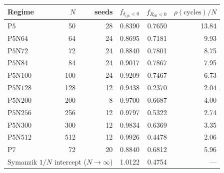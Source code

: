 \begin{tabular}{@{}l r r r r r@{}}
\toprule
Regime & $N$ & seeds & $f_{\delta_{ijk}<0}$ & $f_{R_{00}<0}$ & $\rho(\mathrm{cycles})/N$ \\
\midrule
$\mathrm{P5}$ & 50 & 28 & 0.8390 & 0.7650 & 13.84 \\
$\mathrm{P5N64}$ & 64 & 24 & 0.8695 & 0.7181 & 9.93 \\
$\mathrm{P5N72}$ & 72 & 24 & 0.8840 & 0.7801 & 8.75 \\
$\mathrm{P5N84}$ & 84 & 24 & 0.9017 & 0.7867 & 7.95 \\
$\mathrm{P5N100}$ & 100 & 24 & 0.9209 & 0.7467 & 6.73 \\
$\mathrm{P5N128}$ & 128 & 12 & 0.9438 & 0.2370 & 2.04 \\
$\mathrm{P5N200}$ & 200 & 8 & 0.9700 & 0.6687 & 4.00 \\
$\mathrm{P5N256}$ & 256 & 12 & 0.9797 & 0.5322 & 2.74 \\
$\mathrm{P5N300}$ & 300 & 12 & 0.9834 & 0.6369 & 3.35 \\
$\mathrm{P5N512}$ & 512 & 12 & 0.9926 & 0.4478 & 2.06 \\
$\mathrm{P7}$ & 72 & 20 & 0.8840 & 0.6812 & 5.96 \\
\midrule
\multicolumn{3}{l}{Symanzik $1/N$ intercept ($N\to\infty$)} & 1.0122 & 0.4754 & --- \\
\bottomrule
\end{tabular}
